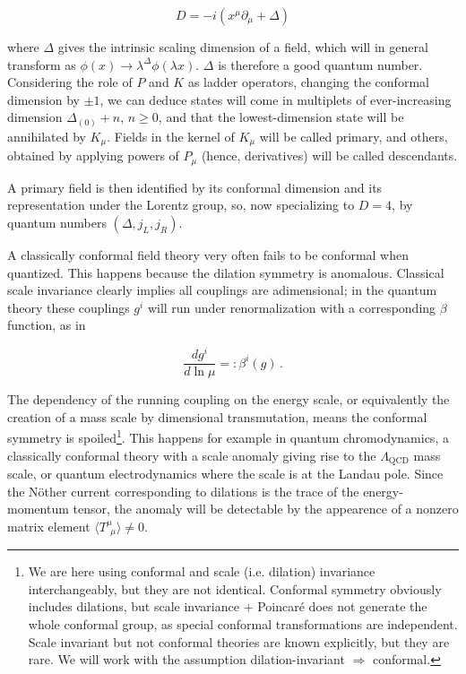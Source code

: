 \begin{equation}
	D = -i (x^\mu\partial_\mu + \Delta)
	\label{}
\end{equation}

where $\Delta$ gives the intrinsic scaling dimension of a field, which will in general transform as $\phi(x) \rightarrow \lambda^{\Delta} \phi(\lambda x)$. $\Delta$ is therefore a good quantum number. Considering the role of $P$ and $K$ as ladder operators, changing the conformal dimension by $\pm 1$, we can deduce states will come in multiplets of ever-increasing dimension $\Delta_{(0)} + n$, $n\geq 0$, and that the lowest-dimension state will be annihilated by $K_\mu$. Fields in the kernel of $K_\mu$ will be called primary, and others, obtained by applying powers of $P_\mu$ (hence, derivatives) will be called descendants.

A primary field is then identified by its conformal dimension and its representation under the Lorentz group, so, now specializing to $D=4$, by quantum numbers $(\Delta,j_L,j_R)$.

A classically conformal field theory very often fails to be conformal when quantized. This happens because the dilation symmetry is anomalous. Classical scale invariance clearly implies all couplings are adimensional; in the quantum theory these couplings $g^i$ will run under renormalization with a corresponding $\beta$ function, as in

\begin{equation}
	\frac{dg^i}{d\ln\mu} =: \beta^i(g)\,.
	\label{}
\end{equation}

The dependency of the running coupling on the energy scale, or equivalently the creation of a mass scale by dimensional transmutation, means the conformal symmetry is spoiled\footnote{We are here using conformal and scale (i.e. dilation) invariance interchangeably, but they are not identical. Conformal symmetry obviously includes dilations, but scale invariance $+$ Poincar\'e does not generate the whole conformal group, as special conformal transformations are independent. Scale invariant but not conformal theories are known explicitly\cite{scalebutnotconf}, but they are rare. We will work with the assumption dilation-invariant $\Rightarrow$ conformal.}. This happens for example in quantum chromodynamics, a classically conformal theory with a scale anomaly giving rise to the $\Lambda_\text{QCD}$ mass scale, or quantum electrodynamics where the scale is at the Landau pole. Since the N\"other current corresponding to dilations is the trace of the energy-momentum tensor, the anomaly will be detectable by the appearence of a nonzero matrix element $\langle T^{\mu}_{\;\,\mu} \rangle \neq 0$.

